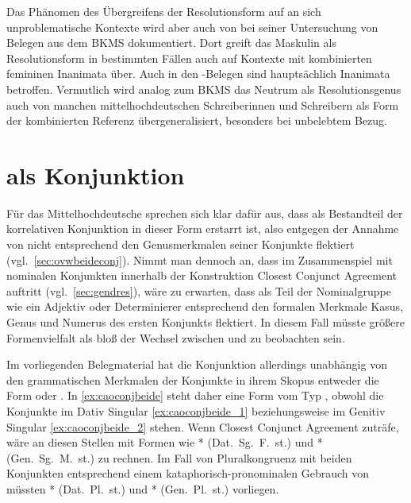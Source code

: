 Das Phänomen des Übergreifens der Resolutionsform auf an sich unproblematische
Kontexte wird aber auch von \citet[302]{corbett1991} bei seiner Untersuchung
von Belegen aus dem BKMS dokumentiert. Dort greift das Maskulin als
Resolutionsform in bestimmten Fällen auch auf Kon\-texte mit kombinierten
femininen Inanimata über. Auch in den \CAO{}-Belegen sind
hauptsächlich Inanimata betroffen. Vermutlich wird analog zum BKMS das Neutrum
als Resolutionsgenus auch von manchen mittelhochdeutschen Schreiberinnen und
Schreibern als Form der kombinierten Referenz übergeneralisiert, besonders bei
unbelebtem Bezug.


\section{ als Konjunktion}
\label{sec:beideconj}

Für das Mittelhochdeutsche sprechen sich \citet[626--627]{ksw2} klar dafür aus,
dass  als Bestandteil der korrelativen Konjunktion   in dieser Form erstarrt ist, also
 entgegen der Annahme von \citet{askedal1974} nicht entsprechend
den Genusmerkmalen seiner Konjunkte flektiert (vgl.~\cref{sec:ovwbeideconj}).
Nimmt man dennoch an, dass im Zusammenspiel mit nominalen Konjunkten innerhalb
der Konstruktion Closest Conjunct Agreement auftritt (vgl.~\cref{sec:gendres}),
wäre zu erwarten, dass  als Teil der Nominalgruppe wie ein Adjektiv
oder Determinierer entsprechend den formalen Merkmale Kasus, Genus und Numerus
des ersten Konjunkts flektiert. In diesem Fall müsste größere Formenvielfalt
als bloß der Wechsel zwischen  und  zu beobachten
sein.

Im vorliegenden Belegmaterial hat die Konjunktion allerdings unabhängig von den
grammatischen Merkmalen der Konjunkte in ihrem Skopus entweder die Form
 oder . In \cref{ex:caoconjbeide} steht daher eine
Form vom Typ , obwohl die Konjunkte im Dativ Singular
\cref{ex:caoconjbeide_1} beziehungsweise im Genitiv Singular
\cref{ex:caoconjbeide_2} stehen. Wenn Closest Conjunct Agreement zuträfe, wäre
an diesen Stellen mit Formen wie * (Dat.~Sg.~F.~st.) und
* (Gen.~Sg.~M.~st.) zu rechnen. Im Fall von Pluralkongruenz mit
beiden Konjunkten entsprechend einem kataphorisch-pronominalen Gebrauch von
 müssten * (Dat.~Pl.~st.) und *
(Gen.~Pl.~st.) vorliegen.

